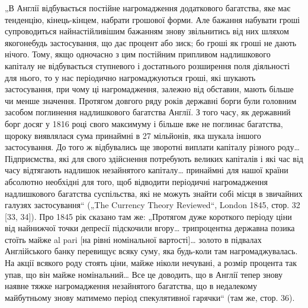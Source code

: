 „В Англії відбувається постійне нагромадження додаткового
багатства, яке має тенденцію, кінець-кінцем, набрати грошової
форми. Але бажання набувати гроші супроводиться найнастійливішим бажанням знову звільнитись від них
шляхом якогонебудь
застосування, що дає процент або зиск; бо гроші як гроші не
дають нічого. Тому, якщо одночасно з цим постійним припливом надлишкового капіталу не відбувається
ступневого і достатнього розширення поля діяльності для нього, то у нас
періодично нагромаджуються гроші, які шукають застосування,
при чому ці нагромадження, залежно від обставин, мають
більше чи менше значення. Протягом довгого ряду років державні борги були головним засобом
поглинення надлишкового
багатства Англії. З того часу, як державний борг досяг у
1816 році свого максимуму і більше вже не поглинає багатства, щороку виявлялася сума принаймні в 27
мільйонів, яка
шукала іншого застосування. До того ж відбувались ще зворотні
виплати капіталу різного роду\dots{} Підприємства, які для свого
здійснення потребують великих капіталів і які час від часу
відтягають надлишок незайнятого капіталу\dots{} принаймні для нашої країни абсолютно необхідні для того,
щоб відводити періодичні нагромадження надлишкового багатства суспільства, які не
можуть знайти собі місця в звичайних галузях застосування“
(„The Currency Theory Reviewed“, London 1845, стор. 32 [33, 34]).
Про 1845 рік сказано там же: „Протягом дуже короткого періоду ціни від найнижчої точки депресії
підскочили вгору\dots{} трипроцентна державна позика стоїть майже al pari [на рівні номінальної
вартості]\dots{} золото в підвалах Англійського банку перевищує всяку суму, яка будь-коли там
нагромаджувалась. На
акції всякого роду стоять ціни, майже ніколи нечувані, а розмір
процента так упав, що він майже номінальний\dots{} Все це доводить,
що в Англії тепер знову наявне тяжке нагромадження незайнятого
багатства, що в недалекому майбутньому знову матимемо період
спекулятивної гарячки“ (там же, стор. 36).

